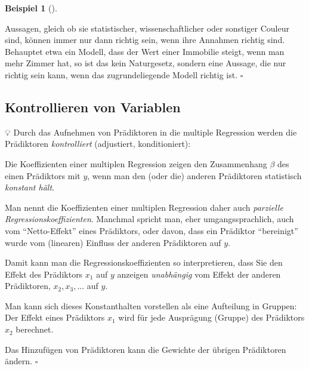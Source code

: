 \documentclass[
  ngerman,
  letterpaper,
  twoside,
  open=any]{scrbook}
\theoremstyle{definition}
\newtheorem{example}{Beispiel}[chapter]
\theoremstyle{plain}
\theoremstyle{definition}
\theoremstyle{definition}
\theoremstyle{remark}
\begin{document}
\begin{example}[]
\begin{tcolorbox}
Aussagen, gleich ob sie statistischer, wissenschaftlicher oder sonstiger
Couleur sind, können immer nur dann richtig sein, wenn ihre Annahmen
richtig sind. Behauptet etwa ein Modell, dass der Wert einer Immobilie
steigt, wenn man mehr Zimmer hat, so ist das kein Naturgesetz, sondern
eine Aussage, die nur richtig sein kann, wenn das zugrundeliegende
Modell richtig ist. \(\square\)

\end{tcolorbox}

\subsection{Kontrollieren von
Variablen}\label{kontrollieren-von-variablen}

💡 Durch das Aufnehmen von Prädiktoren in die multiple Regression werden
die Prädiktoren \emph{kontrolliert} (adjustiert, konditioniert):

Die Koeffizienten einer multiplen Regression zeigen den Zusammenhang
\(\beta\) des einen Prädiktors mit \(y\), wenn man den (oder die)
anderen Prädiktoren statistisch \emph{konstant hält}.

Man nennt die Koeffizienten einer multiplen Regression daher auch
\emph{parzielle Regressionskoeffizienten}. Manchmal spricht man, eher
umgangssprachlich, auch vom \enquote{Netto-Effekt} eines Prädiktors,
oder davon, dass ein Prädiktor \enquote{bereinigt} wurde vom (linearen)
Einfluss der anderen Prädiktoren auf \(y\).

Damit kann man die Regressionskoeffizienten so interpretieren, dass Sie
den Effekt des Prädiktors \(x_1\) auf \(y\) anzeigen \emph{unabhängig}
vom Effekt der anderen Prädiktoren, \(x_2,x_3,...\) auf \(y\).

Man kann sich dieses Konstanthalten vorstellen als eine Aufteilung in
Gruppen: Der Effekt eines Prädiktors \(x_1\) wird für jede Ausprägung
(Gruppe) des Prädiktors \(x_2\) berechnet.

\begin{tcolorbox}[enhanced jigsaw, arc=.35mm, bottomrule=.15mm, bottomtitle=1mm, breakable, colback=white, colbacktitle=quarto-callout-important-color!10!white, colframe=quarto-callout-important-color-frame, coltitle=black, left=2mm, leftrule=.75mm, opacityback=0, opacitybacktitle=0.6, rightrule=.15mm, title=\textcolor{quarto-callout-important-color}{\faExclamation}\hspace{0.5em}{Wichtig}, titlerule=0mm, toprule=.15mm, toptitle=1mm]

Das Hinzufügen von Prädiktoren kann die Gewichte der übrigen Prädiktoren
ändern. \(\square\)


\end{tcolorbox}
\end{example}
\end{document}
